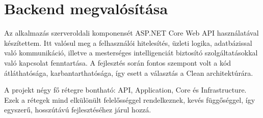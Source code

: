 \newpage

\section{Backend megvalósítása}

Az alkalmazás szerveroldali komponensét ASP.NET Core Web API használatával készítettem. \cite{aspnetcore} Itt valósul meg a felhasználói hitelesítés, üzleti logika, adatbázissal való kommunikáció, illetve a mesterséges intelligenciát biztosító szolgáltatásokkal való kapcsolat fenntartása. A fejlesztés során fontos szempont volt a kód átláthatósága, karbantarthatósága, így esett a választás a Clean architektúrára. \cite{martin2017cleanarchitecture}

A projekt négy fő rétegre bontható: API, Application, Core és Infrastructure. Ezek a rétegek mind elkülönült felelősséggel rendelkeznek, kevés függőséggel, így egyszerű, hosszútávú fejlesztéséhez járul hozzá.

